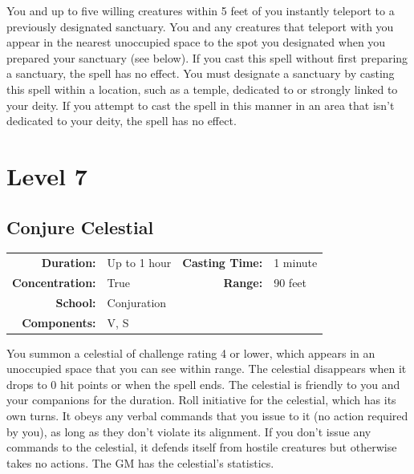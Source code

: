 \documentclass[12pt,showtrims]{memoir}
\begin{document}
\vspace{1\baselineskip}\noindent You and up to five willing creatures within 5 feet of you instantly teleport to a previously designated sanctuary. You and any creatures that teleport with you appear in the nearest unoccupied space to the spot you designated when you prepared your sanctuary (see below). If you cast this spell without first preparing a sanctuary, the spell has no effect. You must designate a sanctuary by casting this spell within a location, such as a temple, dedicated to or strongly linked to your deity. If you attempt to cast the spell in this manner in an area that isn't dedicated to your deity, the spell has no effect.

\newpage
\chapter*{Level 7} 
\section*{Conjure Celestial}

{
\small\centering\vspace{-6pt}
\begin{tabular}{rlrl}
\toprule

\textbf{Duration:} & Up to 1 hour &
\textbf{Casting Time:} & 1 minute \\
\textbf{Concentration:} & True &
\textbf{Range:} & 90 feet \\
\textbf{School:} & Conjuration \\
\textbf{Components:} & \multicolumn{3}{p{0.7\textwidth}}{V, S}\\

\bottomrule
\end{tabular}
}

\vspace{1\baselineskip}\noindent You summon a celestial of challenge rating 4 or lower, which appears in an unoccupied space that you can see within range. The celestial disappears when it drops to 0 hit points or when the spell ends. The celestial is friendly to you and your companions for the duration. Roll initiative for the celestial, which has its own turns. It obeys any verbal commands that you issue to it (no action required by you), as long as they don't violate its alignment. If you don't issue any commands to the celestial, it defends itself from hostile creatures but otherwise takes no actions. The GM has the celestial's statistics.
\end{document}
